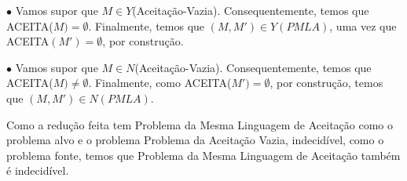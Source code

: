 \documentclass{article}
\begin{document}
\medskip

$\bullet$ Vamos supor que $M \in Y$(Aceitação-Vazia). Consequentemente, temos que ACEITA($M) = \emptyset$. Finalmente, temos que $(M, M') \in Y(PMLA)$, uma vez que ACEITA$(M') = \emptyset$, por construção.

\smallskip

$\bullet$ Vamos supor que $M \in N$(Aceitação-Vazia). Consequentemente, temos que ACEITA($M) \neq \emptyset$. Finalmente, como ACEITA($M') = \emptyset$, por construção, temos que $(M, M') \in N(PMLA)$.

\medskip

Como a redução feita tem  Problema da Mesma Linguagem de Aceitação como o problema alvo e o problema Problema da Aceitação Vazia, indecidível, como o problema fonte, temos que  Problema da Mesma Linguagem de Aceitação também é indecidível.
\end{document}
